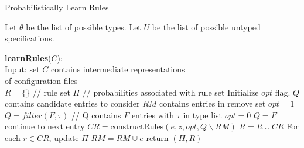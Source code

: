 \begin{algorithm}[t]
\caption{Probabilistically Learn Rules}
\label{alg:plearn}
\begin{footnotesize}
  Let $\theta$ be the list of possible types.
  Let $U$ be the list of possible untyped specifications.
  \begin{algorithmic}[1]
  \State \textbf{learnRules}($C$):\\

  Input: set $C$ contains intermediate representations\\
     \qquad \enspace \enspace of configuration files\\

    \State $R = \{\}$ // rule set
    \State $\Pi$ // probabilities associated with rule set
      \State Initialize $opt$ flag.
        \State $Q$ contains candidate entries to consider
        \State $RM$ contains entries in remove set
         \State $opt = 1$ \State $Q = filter(F,\tau)$
          \State // Q contains $F$ entries with $\tau$ in type list
         \State $opt = 0$ \State $Q = F$
        \EndIf
                        \State continue to next entry
               \Else
                        \State $CR = \textrm{constructRules}(e, z, opt, Q \backslash RM)$
                        \State $R = R  \cup CR$
                        \State For each $r \in CR$, update $\Pi$
               \EndIf
               \State $RM = RM \cup e$
        \EndFor
     \EndFor
    \EndFor
    \State return $(\Pi,R)$
  \end{algorithmic}
\end{footnotesize}
\end{algorithm}


